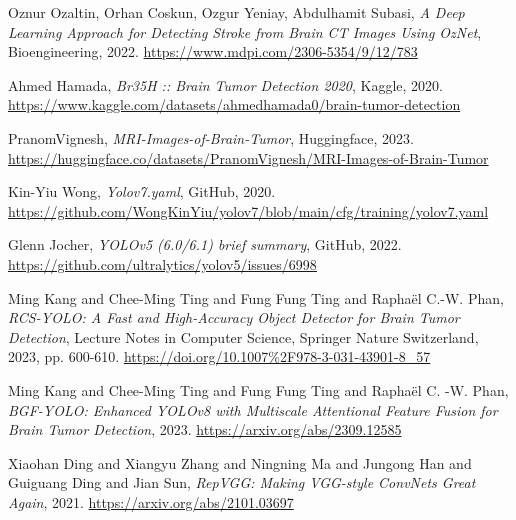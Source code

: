 \documentclass[conference]{IEEEtran}
\begin{document}
 



\begin{thebibliography}{00}

Oznur Ozaltin, Orhan Coskun, Ozgur Yeniay, Abdulhamit Subasi,
\emph{A Deep Learning Approach for Detecting Stroke from Brain CT Images Using OzNet},
Bioengineering,
2022.
\url{https://www.mdpi.com/2306-5354/9/12/783}

Ahmed Hamada,
\emph{Br35H :: Brain Tumor Detection 2020},
Kaggle,
2020.
\url{https://www.kaggle.com/datasets/ahmedhamada0/brain-tumor-detection}

PranomVignesh,
\emph{MRI-Images-of-Brain-Tumor},
Huggingface,
2023.
\url{https://huggingface.co/datasets/PranomVignesh/MRI-Images-of-Brain-Tumor}

Kin-Yiu Wong,
\emph{Yolov7.yaml},
GitHub,
2020.
\url{https://github.com/WongKinYiu/yolov7/blob/main/cfg/training/yolov7.yaml}

Glenn Jocher,
\emph{YOLOv5 (6.0/6.1) brief summary},
GitHub,
2022.
\url{https://github.com/ultralytics/yolov5/issues/6998}

Ming Kang and Chee-Ming Ting and Fung Fung Ting and Raphaël C.-W. Phan,
\emph{RCS-YOLO: A Fast and High-Accuracy Object Detector for Brain Tumor Detection},
Lecture Notes in Computer Science,
Springer Nature Switzerland,
2023,
pp. 600-610.
\url{https://doi.org/10.1007%2F978-3-031-43901-8_57}

Ming Kang and Chee-Ming Ting and Fung Fung Ting and Raphaël C. -W. Phan,
\emph{BGF-YOLO: Enhanced YOLOv8 with Multiscale Attentional Feature Fusion for Brain Tumor Detection},
2023.
\url{https://arxiv.org/abs/2309.12585}

Xiaohan Ding and Xiangyu Zhang and Ningning Ma and Jungong Han and Guiguang Ding and Jian Sun,
\emph{RepVGG: Making VGG-style ConvNets Great Again},
2021.
\url{https://arxiv.org/abs/2101.03697}


\end{thebibliography}
\end{document}
